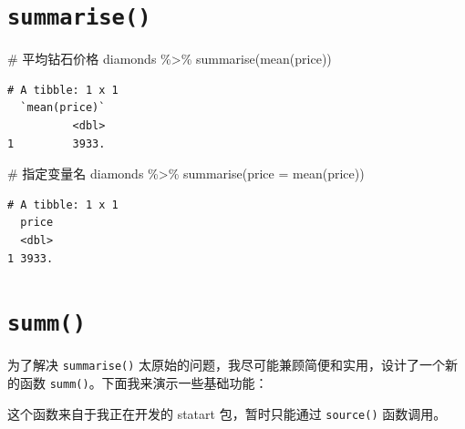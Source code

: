 \documentclass[
  letterpaper,
]{ctexbook}
\newenvironment{Shaded}{\begin{snugshade}}{\end{snugshade}}
\newcommand{\AttributeTok}[1]{\textcolor[rgb]{0.40,0.45,0.13}{#1}}
\newcommand{\CommentTok}[1]{\textcolor[rgb]{0.37,0.37,0.37}{#1}}
\newcommand{\FunctionTok}[1]{\textcolor[rgb]{0.28,0.35,0.67}{#1}}
\newcommand{\NormalTok}[1]{\textcolor[rgb]{0.00,0.23,0.31}{#1}}
\newcommand{\SpecialCharTok}[1]{\textcolor[rgb]{0.37,0.37,0.37}{#1}}
\begin{document}
\hypertarget{summarise}{%
\section{\texorpdfstring{\texttt{summarise()}}{summarise()}}\label{summarise}}

\begin{Shaded}
\begin{Highlighting}[]
\CommentTok{\# 平均钻石价格}
\NormalTok{diamonds }\SpecialCharTok{\%\textgreater{}\%}
  \FunctionTok{summarise}\NormalTok{(}\FunctionTok{mean}\NormalTok{(price))}
\end{Highlighting}
\end{Shaded}

\begin{verbatim}
# A tibble: 1 x 1
  `mean(price)`
          <dbl>
1         3933.
\end{verbatim}

\begin{Shaded}
\begin{Highlighting}[]
\CommentTok{\# 指定变量名}
\NormalTok{diamonds }\SpecialCharTok{\%\textgreater{}\%}
  \FunctionTok{summarise}\NormalTok{(}\AttributeTok{price =} \FunctionTok{mean}\NormalTok{(price))}
\end{Highlighting}
\end{Shaded}

\begin{verbatim}
# A tibble: 1 x 1
  price
  <dbl>
1 3933.
\end{verbatim}

\hypertarget{summ}{%
\section{\texorpdfstring{\texttt{summ()}}{summ()}}\label{summ}}

为了解决 \texttt{summarise()}
太原始的问题，我尽可能兼顾简便和实用，设计了一个新的函数
\texttt{summ()}。下面我来演示一些基础功能：

\begin{tcolorbox}[enhanced jigsaw, bottomtitle=1mm, bottomrule=.15mm, coltitle=black, title=\textcolor{quarto-callout-caution-color}{\faFire}\hspace{0.5em}{注意}, toptitle=1mm, colframe=quarto-callout-caution-color-frame, colbacktitle=quarto-callout-caution-color!10!white, opacitybacktitle=0.6, arc=.35mm, opacityback=0, breakable, toprule=.15mm, left=2mm, titlerule=0mm, rightrule=.15mm, colback=white, leftrule=.75mm]

这个函数来自于我正在开发的 statart 包，暂时只能通过 \texttt{source()}
函数调用。

\end{tcolorbox}
\end{document}
